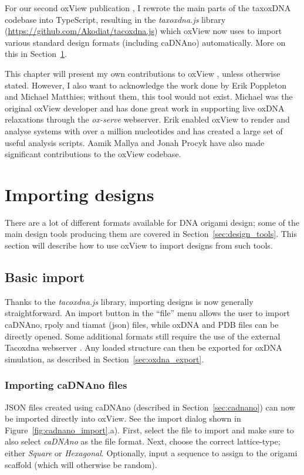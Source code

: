For our second oxView publication \cite{bohlin2021design}, I rewrote the main parts of the taxoxDNA codebase into TypeScript, resulting in the \emph{taxoxdna.js} library (\url{https://github.com/Akodiat/tacoxdna.js}) which oxView now uses to import various standard design formats (including caDNAno) automatically. More on this in Section~\ref{sec:importing_designs}.

This chapter will present my own contributions to oxView \cite{poppleton2020design, bohlin2021design}, unless otherwise stated. However, I also want to acknowledge the work done by Erik Poppleton and Michael Matthies; without them, this tool would not exist. Michael was the original oxView developer and has done great work in supporting live oxDNA relaxations through the \emph{ox-serve} webserver. Erik enabled oxView to render and analyse systems with over a million nucleotides and has created a large set of useful analysis scripts. Aamik Mallya and Jonah Procyk have also made significant contributions to the oxView codebase. 

\section{Importing designs}
\label{sec:importing_designs}
There are a lot of different formats available for DNA origami design; some of the main design tools producing them are covered in Section~\ref{sec:design_tools}. This section will describe how to use oxView to import designs from such tools.

\subsection{Basic import}
Thanks to the \emph{tacoxdna.js} library, importing designs is now generally straightforward. An import button in the ``file'' menu allows the user to import caDNAno, rpoly and tiamat (json) files, while oxDNA and PDB files can be directly opened. Some additional formats still require the use of the external Tacoxdna webserver \cite{taco}. Any loaded structure can then be exported for oxDNA simulation, as described in Section~\ref{sec:oxdna_export}.

\subsubsection{Importing caDNAno files}
JSON files created using caDNAno (described in Section~\ref{sec:cadnano}) can now be imported directly into oxView. See the import dialog shown in Figure~\ref{fig:cadnano_import}.a). First, select the file to import and make sure to also select \emph{caDNAno} as the file format. Next, choose the correct lattice-type; either \emph{Square} or \emph{Hexagonal}. Optionally, input a sequence to assign to the origami scaffold (which will otherwise be random).

